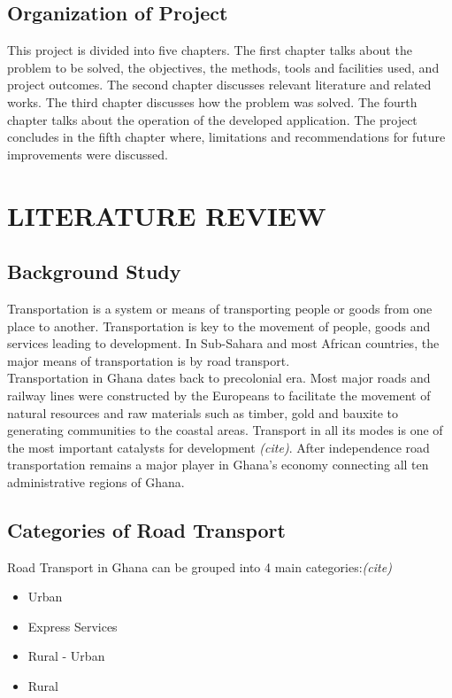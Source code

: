 \documentclass[oneside,12pt]{book}
\begin{document}
\section{Organization of Project}
This project is divided into five chapters. The first chapter talks about the problem to be solved, the objectives, the methods, tools and facilities used, and project outcomes. The second chapter discusses relevant literature and related works. The third chapter discusses how the problem was solved. The fourth chapter talks about the operation of the developed application. The project concludes in the fifth chapter where, limitations and recommendations for future improvements were discussed.

\chapter{LITERATURE REVIEW}

\section{Background Study}
Transportation is a system or means of transporting people or goods from one place to another. Transportation is key to the movement of people, goods and services leading to development. In Sub-Sahara and most African countries, the major means of transportation is by road transport.\\

Transportation in Ghana dates back to precolonial era. Most major roads and railway lines were constructed by the Europeans to facilitate the movement of natural resources and raw materials such as timber, gold and bauxite to generating communities to the coastal areas. Transport in all its modes is one of the most important catalysts for development \textit{(cite)}. %
After independence road transportation remains a major player in Ghana's economy connecting all ten administrative regions of Ghana. 

\section{Categories of Road Transport}
Road Transport in Ghana can be grouped into 4 main categories:\textit{(cite)}
\begin{itemize}
	\item Urban
	\item Express Services
	\item Rural - Urban
	\item Rural
\end{itemize}
\end{document}
